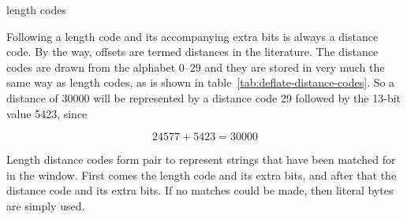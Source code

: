 \begin{table}
  \caption{ length codes}
  \label{tab:deflate-length-codes}
\end{table}

Following a length code and its accompanying extra bits is always a
distance code. By the way, offsets are termed distances in the 
literature. The distance codes are drawn from the alphabet 0--29 and
they are stored in very much the same way as length codes, as is shown
in table~\ref{tab:deflate-distance-codes}. So a distance of $30000$
will be represented by a distance code 29 followed by the 13-bit value
5423, since

\begin{equation*}
  24577 + 5423 = 30000
\end{equation*}

Length distance codes form pair to represent strings that have been
matched for in the window. First comes the length code and its extra
bits, and after that the distance code and its extra bits. If no
matches could be made, then literal bytes are simply used.

